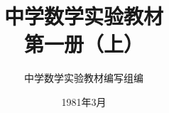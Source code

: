 \documentclass[b5paper, openany]{ctexbook}
\theoremstyle{plain}
\begin{document}
\title{\Huge\bfseries 中学数学实验教材\\第一册（上）}



\author{\Large 中学数学实验教材编写组编}
\date{\Large 1981年3月}

\maketitle




\frontmatter


\tableofcontents


\mainmatter

 

 
 
%
% 
%
% 
\end{document}
